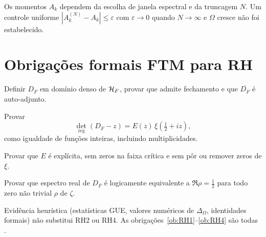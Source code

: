 \documentclass[11pt,a4paper]{article}
\begin{document}
\begin{gap}
Os momentos $A_k$ dependem da escolha de janela espectral e
da truncagem $N$. Um controle uniforme $|A_k^{(N)}-A_k|\le\varepsilon$
com $\varepsilon\to0$ quando $N\to\infty$ e $\Omega$ cresce
não foi estabelecido. \OPEN
\end{gap}

\section{Obrigações formais FTM para RH}

\begin{obligation}[RH1 — Operador]\label{ob:RH1}
Definir $D_F$ em domínio denso de $\mathcal{H}_F$,
provar que admite fechamento e que $\overline{D_F}$ é auto-adjunto.
\end{obligation}

\begin{obligation}\label{ob:RH2}
Provar
\[
  \det_{\mathrm{reg}}(D_F-z)=E(z)\,\xi\!\left(\tfrac12+iz\right),
\]
como igualdade de funções inteiras, incluindo multiplicidades.
\end{obligation}

\begin{obligation}[RH3 — Controle de $E$]\label{ob:RH3}
Provar que $E$ é explícita, sem zeros na faixa crítica e sem
pôr ou remover zeros de $\xi$.
\end{obligation}

\begin{obligation}\label{ob:RH4}
Provar que espectro real de $D_F$ é logicamente equivalente
a $\Re\rho=\tfrac12$ para todo zero não trivial $\rho$ de $\zeta$.
\end{obligation}

\begin{remark}
Evidência heurística (estatísticas GUE, valores numéricos de $\Delta_\Omega$,
identidades formais) não substitui RH2 ou RH4.
As obrigações~\ref{ob:RH1}--\ref{ob:RH4} são todas \OPEN.
\end{remark}

\end{document}
